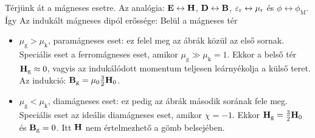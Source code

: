    Térjünk át a mágneses esetre. Az analógia: $\mathbf{E}\leftrightarrow\mathbf{H}$, $\mathbf{D}\leftrightarrow\mathbf{B}$, $\varepsilon_\text{r}\leftrightarrow\mu_\text{r}$ és $\phi\leftrightarrow\phi_\text{M}$. Így
   Az indukált mágneses dipól erőssége:
   Belül a mágneses tér 
   
   \begin{itemize}
    \item $\mu_\text{g}>\mu_\text{k}$, paramágneses eset: ez felel meg az ábrák közül az első sornak. Speciális eset a ferromágneses eset, amikor $\mu_\text{g}\gg\mu_\text{k}=1$. Ekkor a belső tér $\mathbf{H}_\text{g}\approx0$, vagyis az indukálódott momentum teljesen leárnyékolja a külső teret. Az indukció: $\mathbf{B}_\text{g}=\mu_0\frac{3}{2}\mathbf{H}_0$.
    \item $\mu_\text{g}<\mu_\text{k}$, diamágneses eset: ez pedig az ábrák második sorának fele meg. Speciális eset az ideális diamágneses eset, amikor $\chi=-1$. Ekkor $\mathbf{H}_\text{g}=\frac{3}{2}\mathbf{H}_0$ és $\mathbf{B}_\text{g}=0$. Itt $\mathbf{H}$ nem értelmezhető a gömb belsejében.
   \end{itemize}
   
   
   
  
  